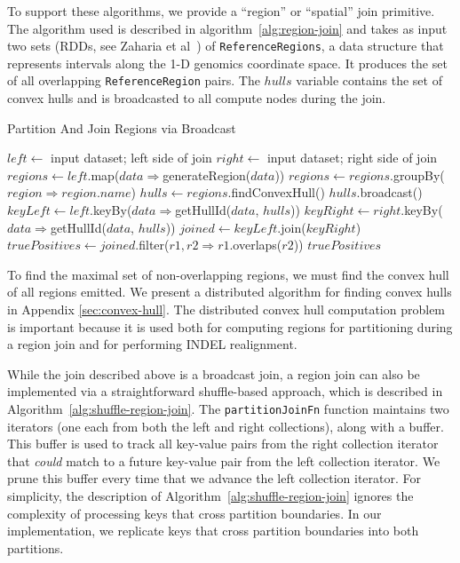 \documentclass{sig-alternate}
\begin{document}
To support these algorithms, we provide a ``region'' or ``spatial'' join primitive. The algorithm used is described
in algorithm~\ref{alg:region-join} and takes as input two sets (RDDs, see Zaharia et al~\cite{zaharia12}) of
\texttt{ReferenceRegions}, a data structure that represents intervals along the 1-D genomics coordinate
space. It produces the set of all overlapping \texttt{ReferenceRegion} pairs. The $hulls$ variable contains
the set of convex hulls and is broadcasted to all compute nodes during the join.

\begin{algorithm}
\caption{Partition And Join Regions via Broadcast}
\label{alg:region-join}
\begin{algorithmic}
\STATE $left \leftarrow$ input dataset; left side of join
\STATE $right \leftarrow$ input dataset; right side of join
\STATE $regions \leftarrow left$.map($data \Rightarrow $generateRegion($data$))
\STATE $regions \leftarrow regions$.groupBy($region \Rightarrow region$.$name$)
\STATE $hulls \leftarrow regions$.findConvexHull()
\STATE $hulls$.broadcast()
\STATE $keyLeft \leftarrow left$.keyBy($data \Rightarrow $getHullId($data$, $hulls$))
\STATE $keyRight \leftarrow right$.keyBy($data \Rightarrow $getHullId($data$, $hulls$))
\STATE $joined \leftarrow keyLeft$.join($keyRight$)
\STATE $truePositives \leftarrow joined$.filter($r1, r2 \Rightarrow r1$.overlaps($r2$))
\RETURN $truePositives$
\end{algorithmic}
\end{algorithm}

To find the maximal set of non-overlapping regions, we must find the convex hull of all regions emitted.
We present a distributed algorithm for finding convex hulls in Appendix \ref{sec:convex-hull}. The
distributed convex hull computation problem is important because it is used both for computing regions
for partitioning during a region join and for performing INDEL realignment.

While the join described above is a broadcast join, a region join can also be implemented via a straightforward
shuffle-based approach, which is described in Algorithm~\ref{alg:shuffle-region-join}. The \texttt{partitionJoinFn}
function maintains two iterators (one each from both the left and right collections), along with a buffer. This buffer is
used to track all key-value pairs from the right collection iterator that \emph{could} match to a future key-value pair
from the left collection iterator. We prune this buffer every time that we advance the left collection iterator. For
simplicity, the description of Algorithm~\ref{alg:shuffle-region-join} ignores the complexity of processing keys that cross
partition boundaries. In our implementation, we replicate keys that cross partition boundaries into both partitions.
\end{document}
